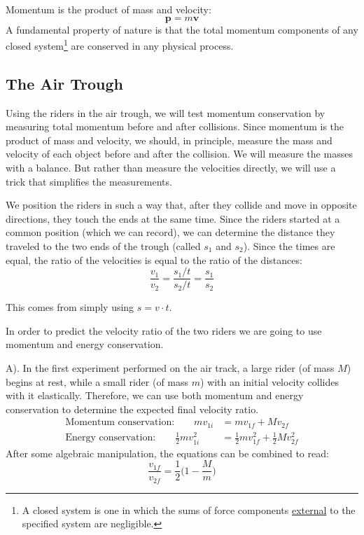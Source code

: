 Momentum is the product of mass and velocity:
\begin{equation}
  \mathbf{p}=m\mathbf{v}
\end{equation}
A fundamental property of nature is that the total momentum components of any closed system\footnote{A closed system is one in which the sums of force components \underline{external} to the specified system are negligible.} are conserved in any physical process.
\subsection{The Air Trough}
Using the riders in the air trough, we will test momentum conservation by measuring total momentum before and after collisions. Since momentum is the product of mass and velocity, we should, in principle, measure the mass and velocity of each object before and after the collision. We will measure the masses with a balance. But rather than measure the velocities directly, we will use a trick that simplifies the measurements. \myskip

We position the riders in such a way that, after they collide and move in opposite directions, they touch the ends at the same time. Since the riders started at a common position (which we can record), we can determine the distance they traveled to the two ends of the trough (called $s_1$ and $s_2$). Since the times are equal, the ratio of the velocities is equal to the ratio of the distances:
\begin{equation}
  \frac{v_{1}}{v_{2}}=\frac{s_{1}/t}{s_{2}/t}=\frac{s_{1}}{s_{2}}
\end{equation}

This comes from simply using $s=v\cdot t$.\myskip

In order to predict the velocity ratio of the two riders we are going to use momentum and energy conservation.\myskip

A). In the first experiment performed on the air track, a large rider (of mass $M$) begins at rest, while a small rider (of mass $m$) with an initial velocity collides with it elastically. Therefore, we can use both momentum and energy conservation to determine the expected final velocity ratio.
\begin{align}
  \textrm{Momentum conservation:}\qquad  mv_{1i} &= mv_{1f}+Mv_{2f}\\
  \textrm{Energy conservation:}\qquad \frac{1}{2} mv_{1i}^2 &=\frac{1}{2}mv_{1f}^2+\frac{1}{2}Mv_{2f}^2
\end{align}
After some algebraic manipulation, the equations can be combined to read:
\begin{equation}
  \frac{v_{1f}}{v_{2f}}=\frac{1}{2}\bigg(1-\frac{M}{m}\bigg)
\end{equation}

